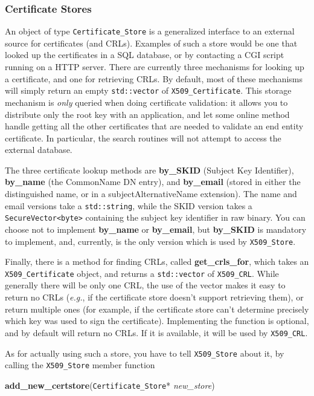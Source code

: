 \documentclass{article}
\newcommand{\function}[1]{\textbf{#1}}
\newcommand{\type}[1]{\texttt{#1}}
\renewcommand{\arg}[1]{\textsl{#1}}
\newcommand{\eg}[0]{\emph{e.g.}}
\begin{document}
\subsubsection{Certificate Stores}

An object of type \type{Certificate\_Store} is a generalized interface to an
external source for certificates (and CRLs). Examples of such a store would be
one that looked up the certificates in a SQL database, or by contacting a CGI
script running on a HTTP server. There are currently three mechanisms for
looking up a certificate, and one for retrieving CRLs. By default, most of
these mechanisms will simply return an empty \type{std::vector} of
\type{X509\_Certificate}. This storage mechanism is \emph{only} queried when
doing certificate validation: it allows you to distribute only the root key
with an application, and let some online method handle getting all the other
certificates that are needed to validate an end entity certificate. In
particular, the search routines will not attempt to access the external
database.

The three certificate lookup methods are \function{by\_SKID} (Subject Key
Identifier), \function{by\_name} (the CommonName DN entry), and
\function{by\_email} (stored in either the distinguished name, or in a
subjectAlternativeName extension). The name and email versions take a
\type{std::string}, while the SKID version takes a \type{SecureVector<byte>}
containing the subject key identifier in raw binary. You can choose not to
implement \function{by\_name} or \function{by\_email}, but \function{by\_SKID}
is mandatory to implement, and, currently, is the only version which is used by
\type{X509\_Store}.

Finally, there is a method for finding CRLs, called \function{get\_crls\_for},
which takes an \type{X509\_Certificate} object, and returns a
\type{std::vector} of \type{X509\_CRL}. While generally there will be only one
CRL, the use of the vector makes it easy to return no CRLs (\eg, if the
certificate store doesn't support retrieving them), or return multiple ones
(for example, if the certificate store can't determine precisely which key was
used to sign the certificate). Implementing the function is optional, and by
default will return no CRLs. If it is available, it will be used by
\type{X509\_CRL}.

As for actually using such a store, you have to tell \type{X509\_Store} about
it, by calling the \type{X509\_Store} member function

\function{add\_new\_certstore}(\type{Certificate\_Store}* \arg{new\_store})
\end{document}
